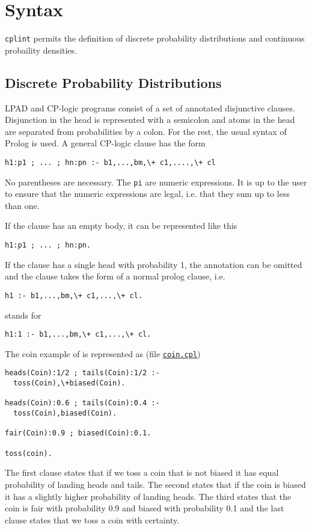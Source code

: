 \section{Syntax}
\label{syn}
\texttt{cplint} permits the definition of discrete probability distributions and continuous probaility
densities.
\subsection{Discrete Probability Distributions}
\label{discrete}
LPAD and CP-logic programs consist of a set of annotated disjunctive clauses.
Disjunction in the head is represented with a semicolon and atoms in the head are separated from probabilities by a colon. For the rest, the usual syntax of Prolog is used.
A general CP-logic clause has the form
\begin{verbatim}
h1:p1 ; ... ; hn:pn :- b1,...,bm,\+ c1,....,\+ cl
\end{verbatim}
 No parentheses are necessary. The \texttt{pi} are numeric expressions. It is up to the user to ensure that the numeric expressions are legal, i.e. that they sum up to less than one.

If the clause has an empty body, it can be represented like this
\begin{verbatim}
h1:p1 ; ... ; hn:pn.
\end{verbatim}
If the clause has a single head with probability 1, the annotation can be omitted and the clause takes the form of a normal prolog clause, i.e. 
\begin{verbatim}
h1 :- b1,...,bm,\+ c1,...,\+ cl.
\end{verbatim}
stands for 
\begin{verbatim}
h1:1 :- b1,...,bm,\+ c1,...,\+ cl.
\end{verbatim}
The coin example of  \cite{VenVer04-ICLP04-IC} is represented as (file \href{http://cplint.lamping.unife.it/example/inference/coin.cpl}{\texttt{coin.cpl}})
\begin{verbatim}
heads(Coin):1/2 ; tails(Coin):1/2 :- 
  toss(Coin),\+biased(Coin).

heads(Coin):0.6 ; tails(Coin):0.4 :- 
  toss(Coin),biased(Coin).

fair(Coin):0.9 ; biased(Coin):0.1.

toss(coin).
\end{verbatim}
The first clause states that if we toss a coin that is not biased it has equal probability of landing heads and tails. The second states that if the coin is biased it has a slightly higher probability of landing heads. The third states that the coin is fair with probability 0.9 and biased with probability 0.1 and the last clause states that we toss a coin with certainty.

